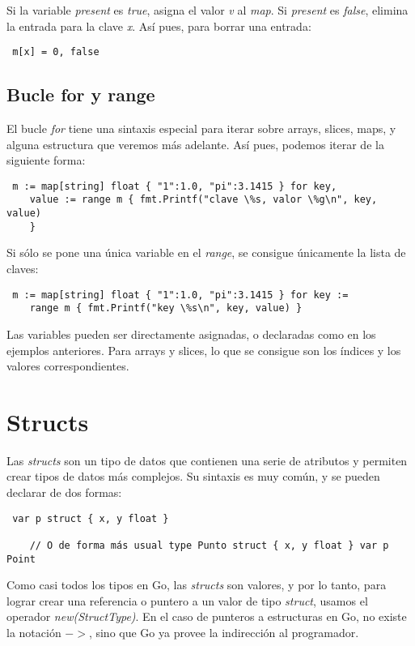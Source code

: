 	Si la variable \textit{present} es \textit{true}, asigna el valor \textit{v}
	al \textit{map}. Si \textit{present} es \textit{false}, elimina la entrada
	para la clave \textit{x}. Así pues, para borrar una entrada:
	
	\begin{verbatim} m[x] = 0, false \end{verbatim}
	
	\subsection{Bucle for y range}
	
	El bucle \textit{for} tiene una sintaxis especial para iterar sobre arrays,
	slices, maps, y alguna estructura que veremos más adelante. Así pues,
	podemos iterar de la siguiente forma:
	
	\begin{verbatim} m := map[string] float { "1":1.0, "pi":3.1415 } for key,
	value := range m { fmt.Printf("clave \%s, valor \%g\n", key, value)
	} \end{verbatim}
	
	Si sólo se pone una única variable en el \textit{range}, se consigue
	únicamente la lista de claves:
	
	\begin{verbatim} m := map[string] float { "1":1.0, "pi":3.1415 } for key :=
	range m { fmt.Printf("key \%s\n", key, value) } \end{verbatim}
	
	Las variables pueden ser directamente asignadas, o declaradas como en los
	ejemplos anteriores. Para arrays y slices, lo que se consigue son los
	índices y los valores correspondientes.

\section{Structs}

Las \textit{structs} son un tipo de datos que contienen una serie de atributos
y permiten crear tipos de datos más complejos. Su sintaxis es muy común, y se
pueden declarar de dos formas:

\begin{verbatim} var p struct { x, y float }
    
	// O de forma más usual type Punto struct { x, y float } var p Point
	\end{verbatim}

Como casi todos los tipos en Go, las \textit{structs} son valores, y por lo
tanto, para lograr crear una referencia o puntero a un valor de tipo
\textit{struct}, usamos el operador \textit{new(StructType)}. En el caso de
punteros a estructuras en Go, no existe la notación $->$, sino que Go ya provee
la indirección al programador.


